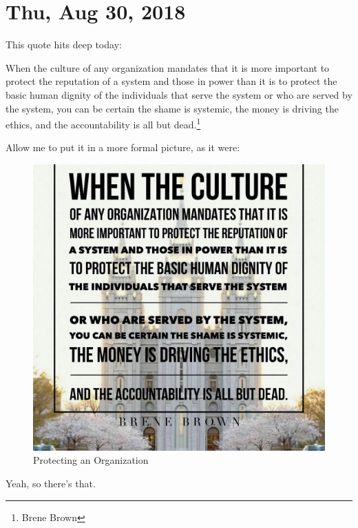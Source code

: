 \section{Thu, Aug 30, 2018}

This quote hits deep today:

\begin{displayquote}
When the culture of any organization mandates that it is more important to protect
the reputation of a system and those in power than it is to protect the basic human
dignity of the individuals that serve the system or who are served by the system, you
can be certain the shame is systemic, the money is driving the ethics, and the
accountability is all but dead.\footnote{Brene Brown}
\end{displayquote}

Allow me to put it in a more formal picture, as it were:

\begin{figure}[h!]
  \centering
  \includegraphics[width=1\linewidth]{2018/images/protect.jpg}
  \caption{Protecting an Organization}
  \label{fig:protect}
\end{figure}

Yeah, so there's that.